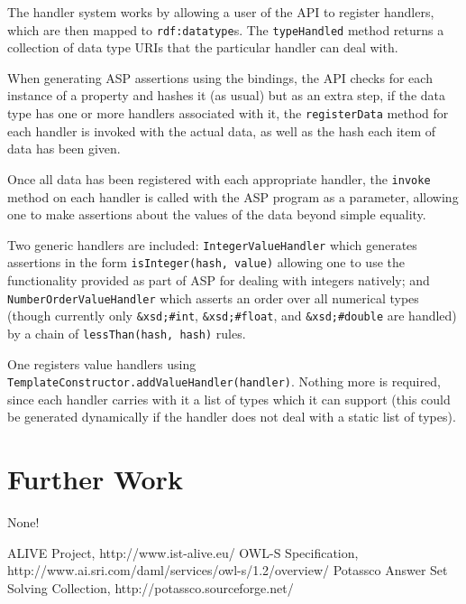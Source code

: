 \documentclass{llncs}
\begin{document}
 The handler system works by allowing a user of the API to register handlers, 
 which are then mapped to \texttt{rdf:datatype}s. The \texttt{typeHandled} 
 method returns a collection of data type URIs that the particular handler can 
 deal with.

 When generating ASP assertions using the bindings, the API checks for 
 each instance of a property and hashes it (as usual) but as an extra 
 step, if the data type has one or more handlers associated with it, the 
 \texttt{registerData} method for each handler is invoked with the actual 
 data, as well as the hash each item of data has been given.

 Once all data has been registered with each appropriate handler, the 
 \texttt{invoke} method on each handler is called with the ASP program 
 as a parameter, allowing one to make assertions about the values of the 
 data beyond simple equality.

 Two generic handlers are included: \texttt{IntegerValueHandler} which generates 
 assertions in the form \texttt{isInteger(hash, value)} allowing one to use the 
 functionality provided as part of ASP for dealing with integers natively; and 
 \texttt{NumberOrderValueHandler} which asserts an order over all numerical types 
 (though currently only \texttt{\&xsd;\#int}, \texttt{\&xsd;\#float}, and \texttt{\&xsd;\#double} 
 are handled) by a chain of \texttt{lessThan(hash, hash)} rules.

 One registers value handlers using \texttt{TemplateConstructor.addValueHandler(handler)}. 
 Nothing more is required, since each handler carries with it a list of types 
 which it can support (this could be generated dynamically if the handler 
 does not deal with a static list of types).

\section{Further Work}

 None!

\begin{thebibliography}{99}

ALIVE Project, http://www.ist-alive.eu/
OWL-S Specification, http://www.ai.sri.com/daml/services/owl-s/1.2/overview/
Potassco Answer Set Solving Collection, http://potassco.sourceforge.net/

\end{thebibliography}
\end{document}

